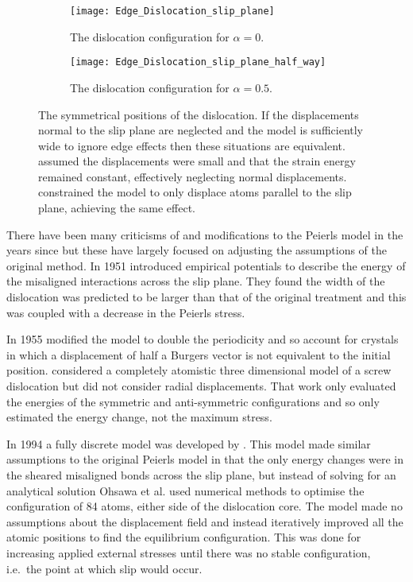 \begin{figure}
\centering
\begin{subfigure}{0.5\textwidth}
\centering\texttt{[image: Edge\_Dislocation\_slip\_plane]}
\caption{The dislocation configuration for $\alpha=0$.}
\end{subfigure}


\begin{subfigure}{0.5\textwidth}
\centering\texttt{[image: Edge\_Dislocation\_slip\_plane\_half\_way]}
\caption{The dislocation configuration for $\alpha=0.5$.}
\end{subfigure}

\caption[The symmetrical positions of the dislocation.]{The symmetrical positions of the dislocation. If the displacements normal to the slip plane are neglected and the model is sufficiently wide to ignore edge effects then these situations are equivalent. \citet{Peierls1940} assumed the displacements were small and that the strain energy remained constant, effectively neglecting normal displacements. \citet{Clegg2006} constrained the model to only displace atoms parallel to the slip plane, achieving the same effect.\label{fig:symmetrical_positions}}
\end{figure}


There have been many criticisms of and modifications to the Peierls model in the years since but these have largely focused on adjusting the assumptions of the original method.
In 1951 \citet{Foreman1951} introduced empirical potentials to describe the energy of the misaligned interactions across the slip plane. They found the width of the dislocation was predicted to be larger than that of the original treatment and this was coupled with a decrease in the Peierls stress.

In 1955 \citet{Huntington1955} modified the model to double the periodicity and so account for crystals in which a displacement of half a Burgers vector is not equivalent to the initial position.
\citet{Maradudin1959} considered a completely atomistic three dimensional model of a screw dislocation but did not consider radial displacements. That work only evaluated the energies of the symmetric and anti-symmetric configurations and so only estimated the energy change, not the maximum stress.



In 1994 a fully discrete model was developed by \citet{Ohsawa1994}. This model made similar assumptions to the original Peierls model in that the only energy changes were in the sheared misaligned bonds across the slip plane, but instead of solving for an analytical solution Ohsawa et al. used numerical methods to optimise the configuration of 84 atoms,  either side of the dislocation core. The model made no assumptions about the displacement field and instead iteratively improved all the atomic positions to find the equilibrium configuration. This was done for increasing applied external stresses until there was no stable configuration, i.e.\ the point at which slip would occur.

